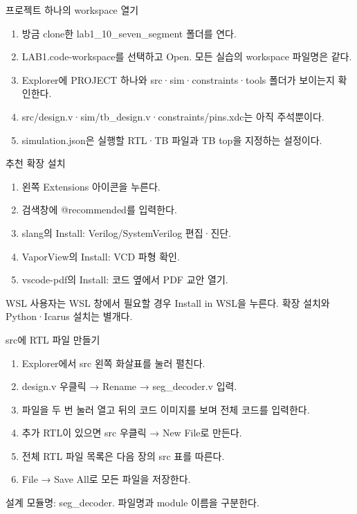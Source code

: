 \begin{frame}{프로젝트 하나의 workspace 열기}\relax
\small
\begin{enumerate}\setlength{\itemsep}{0.22cm}
\item 방금 clone한 lab1\_10\_seven\_segment 폴더를 연다.
\item LAB1.code-workspace를 선택하고 Open. 모든 실습의 workspace 파일명은 같다.
\item Explorer에 PROJECT 하나와 src·sim·constraints·tools 폴더가 보이는지 확인한다.
\item src/design.v·sim/tb\_design.v·constraints/pins.xdc는 아직 주석뿐이다.
\item simulation.json은 실행할 RTL·TB 파일과 TB top을 지정하는 설정이다.
\end{enumerate}

\end{frame}

\begin{frame}{추천 확장 설치}\relax
\small
\begin{enumerate}\setlength{\itemsep}{0.22cm}
\item 왼쪽 Extensions 아이콘을 누른다.
\item 검색창에 @recommended를 입력한다.
\item slang의 Install: Verilog/SystemVerilog 편집·진단.
\item VaporView의 Install: VCD 파형 확인.
\item vscode-pdf의 Install: 코드 옆에서 PDF 교안 열기.
\end{enumerate}
WSL 사용자는 WSL 창에서 필요할 경우 Install in WSL을 누른다. 확장 설치와 Python·Icarus 설치는 별개다.\par
\end{frame}

\begin{frame}{src에 RTL 파일 만들기}\relax
\small
\begin{enumerate}\setlength{\itemsep}{0.22cm}
\item Explorer에서 src 왼쪽 화살표를 눌러 펼친다.
\item design.v 우클릭 → Rename → seg\_decoder.v 입력.
\item 파일을 두 번 눌러 열고 뒤의 코드 이미지를 보며 전체 코드를 입력한다.
\item 추가 RTL이 있으면 src 우클릭 → New File로 만든다.
\item 전체 RTL 파일 목록은 다음 장의 src 표를 따른다.
\item File → Save All로 모든 파일을 저장한다.
\end{enumerate}
설계 모듈명: seg\_decoder. 파일명과 module 이름을 구분한다.\par
\end{frame}

